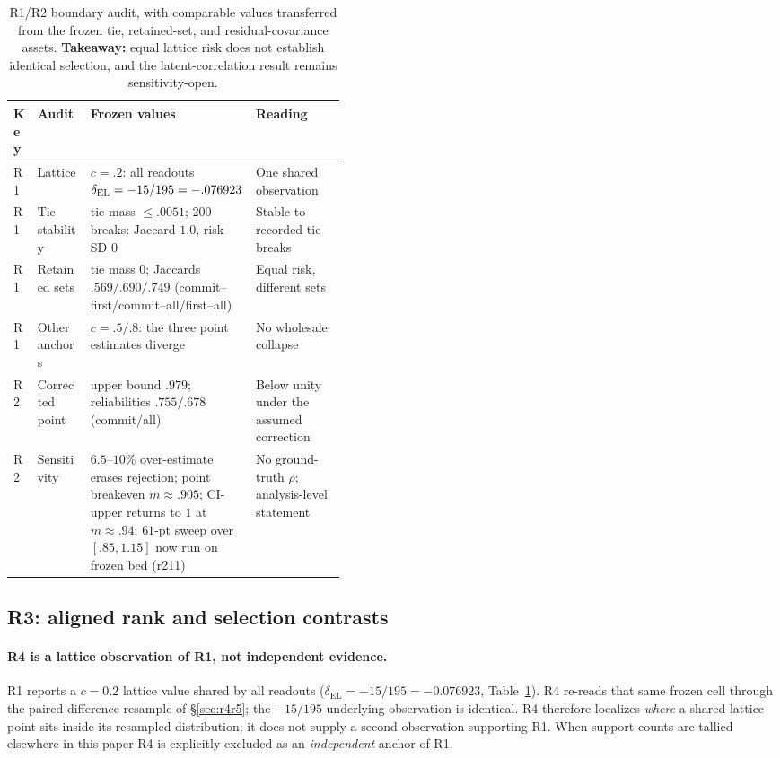 \documentclass{article}
\begin{document}
\begin{table}[t]
\caption{R1/R2 boundary audit, with comparable values transferred from the frozen tie,
retained-set, and residual-covariance assets.  \textbf{Takeaway:} equal lattice risk does not
establish identical selection, and the latent-correlation result remains sensitivity-open.}
\label{tab:r1r2audit}
\centering\footnotesize
\setlength{\tabcolsep}{3.5pt}
\begin{tabularx}{\linewidth}{@{}l>{\raggedright\arraybackslash}p{0.16\linewidth}>{\raggedright\arraybackslash}X>{\raggedright\arraybackslash}p{0.27\linewidth}@{}}
\toprule
Key & Audit & Frozen values & Reading \\
\midrule
R1 & Lattice & $c=.2$: all readouts $\delta_{\rm EL}=-15/195=-.076923$ & One shared observation \\
R1 & Tie stability & tie mass $\le.0051$; 200 breaks: Jaccard $1.0$, risk SD $0$ & Stable to recorded tie breaks \\
R1 & Retained sets & tie mass $0$; Jaccards $.569/.690/.749$ (commit--first/commit--all/first--all) & Equal risk, different sets \\
R1 & Other anchors & $c=.5/.8$: the three point estimates diverge & No wholesale collapse \\
R2 & Corrected point & upper bound $.979$; reliabilities $.755/.678$ (commit/all) & Below unity under the assumed correction \\
R2 & Sensitivity & $6.5$--$10\%$ over-estimate erases rejection; point breakeven $m\approx.905$; CI-upper returns to $1$ at $m\approx.94$; $61$-pt sweep over $[.85,1.15]$ now run on frozen bed (r211) & No ground-truth $\rho$; analysis-level statement \\
\bottomrule
\end{tabularx}
\end{table}

\subsection{R3: aligned rank and selection contrasts}
\label{sec:r3}

\paragraph{R4 is a lattice observation of R1, not independent evidence.}
R1 reports a $c=0.2$ lattice value shared by all readouts
($\delta_{\mathrm{EL}}=-15/195=-0.076923$, Table~\ref{tab:r1r2audit}).  R4 re-reads that same
frozen cell through the paired-difference resample of \S\ref{sec:r4r5}; the $-15/195$
underlying observation is identical.  R4 therefore localizes \emph{where} a shared lattice
point sits inside its resampled distribution; it does not supply a second observation
supporting R1.  When support counts are tallied elsewhere in this paper R4 is explicitly
excluded as an \emph{independent} anchor of R1.
\end{document}
